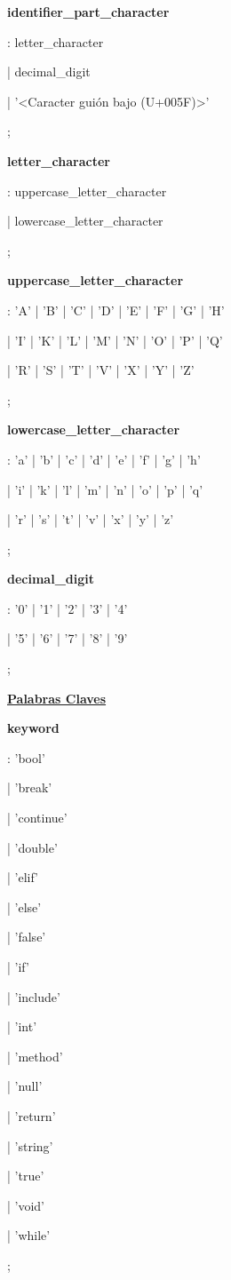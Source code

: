 		\textbf{identifier\_part\_character}\par
		: letter\_character\par
		| decimal\_digit\par
		| '<Caracter guión bajo (U+005F)>'\par
		;\par
		
		\textbf{letter\_character}\par
		: uppercase\_letter\_character\par
		| lowercase\_letter\_character\par
		;\par
		
		\textbf{uppercase\_letter\_character}\par
		: 'A' | 'B' | 'C' | 'D' | 'E' | 'F' | 'G' | 'H'\par 
		| 'I' | 'K' | 'L' | 'M' | 'N' | 'O' | 'P' | 'Q'\par 
		| 'R' | 'S' | 'T' | 'V' | 'X' | 'Y' | 'Z'\par    
		;\par
		
		\textbf{lowercase\_letter\_character}\par
		: 'a' | 'b' | 'c' | 'd' | 'e' | 'f' | 'g' | 'h'\par 
		| 'i' | 'k' | 'l' | 'm' | 'n' | 'o' | 'p' | 'q'\par
		| 'r' | 's' | 't' | 'v' | 'x' | 'y' | 'z'\par
		;\par
		
		\textbf{decimal\_digit}\par
		: '0' | '1' | '2' | '3' | '4'\par 
		| '5' | '6' | '7' | '8' | '9'\par
		;\par
		
		\underline{\textbf{Palabras Claves}}\par
		\textbf{keyword}\par             
		: 'bool'\par
		| 'break'\par
		| 'continue'\par 
		| 'double'\par
		| 'elif'\par
		| 'else'\par
		| 'false'\par
		| 'if'\par
		| 'include'\par
		| 'int'\par
		| 'method'\par
		| 'null'\par
		| 'return'\par
		| 'string'\par
		| 'true'\par
		| 'void'\par
		| 'while'\par
		;\par
		
